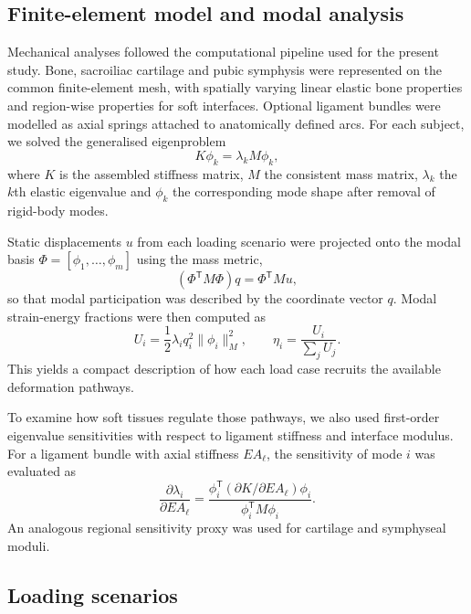 \documentclass[11pt,a4paper]{article}
\begin{document}
\subsection{Finite-element model and modal analysis}

Mechanical analyses followed the computational pipeline used for the present study. Bone, sacroiliac cartilage and pubic symphysis were represented on the common finite-element mesh, with spatially varying linear elastic bone properties and region-wise properties for soft interfaces. Optional ligament bundles were modelled as axial springs attached to anatomically defined arcs. For each subject, we solved the generalised eigenproblem
\begin{equation}
K\phi_k = \lambda_k M\phi_k,
\end{equation}
where $K$ is the assembled stiffness matrix, $M$ the consistent mass matrix, $\lambda_k$ the $k$th elastic eigenvalue and $\phi_k$ the corresponding mode shape after removal of rigid-body modes.

Static displacements $u$ from each loading scenario were projected onto the modal basis $\Phi = [\phi_1,\ldots,\phi_m]$ using the mass metric,
\begin{equation}
(\Phi^{\mathsf T} M \Phi) q = \Phi^{\mathsf T} M u,
\end{equation}
so that modal participation was described by the coordinate vector $q$. Modal strain-energy fractions were then computed as
\begin{equation}
U_i = \frac{1}{2}\lambda_i q_i^2 \lVert \phi_i \rVert_M^2, \qquad
\eta_i = \frac{U_i}{\sum_j U_j}.
\end{equation}
This yields a compact description of how each load case recruits the available deformation pathways.

To examine how soft tissues regulate those pathways, we also used first-order eigenvalue sensitivities with respect to ligament stiffness and interface modulus. For a ligament bundle with axial stiffness $EA_\ell$, the sensitivity of mode $i$ was evaluated as
\begin{equation}
\frac{\partial \lambda_i}{\partial EA_\ell} =
\frac{\phi_i^{\mathsf T} \left(\partial K / \partial EA_\ell\right) \phi_i}{\phi_i^{\mathsf T} M \phi_i}.
\end{equation}
An analogous regional sensitivity proxy was used for cartilage and symphyseal moduli.

\subsection{Loading scenarios}
\end{document}
